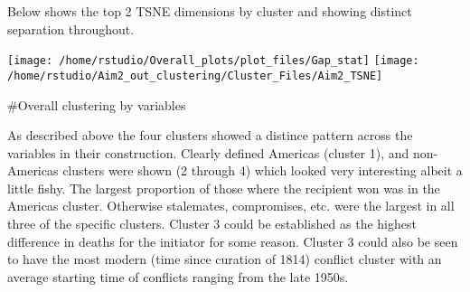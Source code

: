 \documentclass[
]{article}
\begin{document}
Below shows the top 2 TSNE dimensions by cluster and showing distinct
separation throughout.

\texttt{[image: /home/rstudio/Overall\_plots/plot\_files/Gap\_stat]}
\texttt{[image: /home/rstudio/Aim2\_out\_clustering/Cluster\_Files/Aim2\_TSNE]}

\#Overall clustering by variables

As described above the four clusters showed a distince pattern across
the variables in their construction. Clearly defined Americas (cluster
1), and non-Americas clusters were shown (2 through 4) which looked very
interesting albeit a little fishy. The largest proportion of those where
the recipient won was in the Americas cluster. Otherwise stalemates,
compromises, etc. were the largest in all three of the specific
clusters. Cluster 3 could be established as the highest difference in
deaths for the initiator for some reason. Cluster 3 could also be seen
to have the most modern (time since curation of 1814) conflict cluster
with an average starting time of conflicts ranging from the late 1950s.
\end{document}
